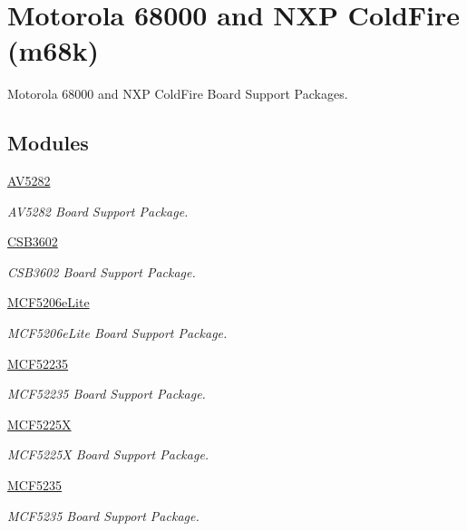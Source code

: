 \hypertarget{group__RTEMSBSPsM68k}{}\section{Motorola 68000 and N\+XP Cold\+Fire (m68k)}
\label{group__RTEMSBSPsM68k}


Motorola 68000 and N\+XP Cold\+Fire Board Support Packages.  


\subsection*{Modules}
\begin{DoxyCompactItemize}
\item 
\mbox{\hyperlink{group__RTEMSBSPsM68kAV5282}{A\+V5282}}
\begin{DoxyCompactList}\small\item\em A\+V5282 Board Support Package. \end{DoxyCompactList}\item 
\mbox{\hyperlink{group__RTEMSBSPsM68kCSB3602}{C\+S\+B3602}}
\begin{DoxyCompactList}\small\item\em C\+S\+B3602 Board Support Package. \end{DoxyCompactList}\item 
\mbox{\hyperlink{group__RTEMSBSPsM68kMCF5206Elite}{M\+C\+F5206e\+Lite}}
\begin{DoxyCompactList}\small\item\em M\+C\+F5206e\+Lite Board Support Package. \end{DoxyCompactList}\item 
\mbox{\hyperlink{group__RTEMSBSPsM68kMCF52235}{M\+C\+F52235}}
\begin{DoxyCompactList}\small\item\em M\+C\+F52235 Board Support Package. \end{DoxyCompactList}\item 
\mbox{\hyperlink{group__RTEMSBSPsM68kMCF5225X}{M\+C\+F5225X}}
\begin{DoxyCompactList}\small\item\em M\+C\+F5225X Board Support Package. \end{DoxyCompactList}\item 
\mbox{\hyperlink{group__RTEMSBSPsM68kMCF5235}{M\+C\+F5235}}
\begin{DoxyCompactList}\small\item\em M\+C\+F5235 Board Support Package. \end{DoxyCompactList}\item 

\end{DoxyCompactItemize}
